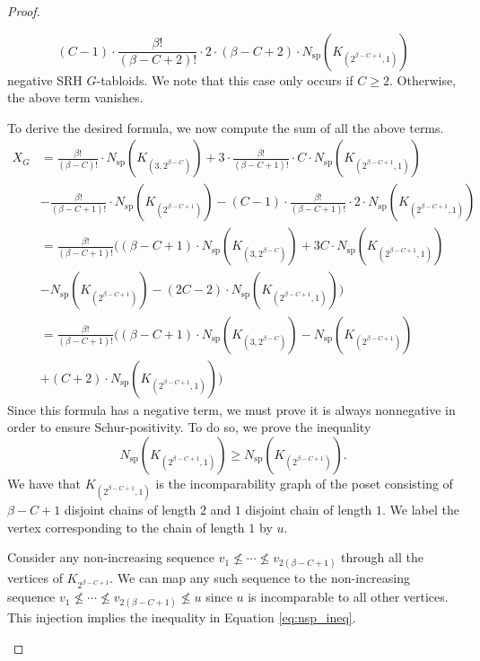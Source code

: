 \documentclass[12pt]{amsart}
\numberwithin{equation}{section}
\theoremstyle{plain}
\theoremstyle{definition}
\theoremstyle{remark}
\begin{document}
\begin{proof}
\begin{enumerate}
\begin{enumerate}[(a)]
        \[
        (C-1)\cdot \frac{\beta !}{(\beta-C+2)!}\cdot 2\cdot (\beta-C+2)\cdot N_{\mathrm{sp}}(K_{(2^{\beta-C+1},1)})
        \]
        negative SRH $G$-tabloids. We note that this case only occurs if $C\ge 2$. Otherwise, the above term vanishes.
    \end{enumerate}
    To derive the desired formula, we now compute the sum of all the above terms.
    \begin{align*}
        [s_{\lambda}]X_{G}&=\frac{\beta !}{(\beta-C)!}\cdot N_{\mathrm{sp}}(K_{(3,2^{\beta-C})})+3\cdot \frac{\beta!}{(\beta-C+1)!}\cdot C \cdot N_{\mathrm{sp}}(K_{(2^{\beta-C+1},1)})\\
        &-\frac{\beta !}{(\beta-C+1)!}\cdot N_{\mathrm{sp}}(K_{(2^{\beta-C+1})})-(C-1)\cdot \frac{\beta !}{(\beta-C+1)!}\cdot 2\cdot N_{\mathrm{sp}}(K_{(2^{\beta-C+1},1)})\\
        &=\frac{\beta!}{(\beta-C+1)!}\Big((\beta-C+1)\cdot N_{\mathrm{sp}}(K_{(3,2^{\beta-C})})+3C\cdot N_{\mathrm{sp}}(K_{(2^{\beta-C+1},1)})\\
        &-N_{\mathrm{sp}}(K_{(2^{\beta-C+1})})-(2C-2)\cdot N_{\mathrm{sp}}(K_{(2^{\beta-C+1},1)})\Big)\\
        &=\frac{\beta !}{(\beta - C+1)!} \Big((\beta-C+1)\cdot N_{\mathrm{sp}}(K_{(3,2^{\beta-C})})-N_{\mathrm{sp}}(K_{(2^{\beta-C+1})})\\
        &+(C+2)\cdot N_{\mathrm{sp}}(K_{(2^{\beta-C+1},1)})\Big)
    \end{align*}
    Since this formula has a negative term, we must prove it is always nonnegative in order to ensure Schur-positivity. To do so, we prove the inequality
    \begin{equation}
    \label{eq:nsp_ineq}
    N_{\mathrm{sp}}(K_{(2^{\beta-C+1},1)})\ge N_{\mathrm{sp}}(K_{(2^{\beta-C+1})}).
    \end{equation}
    We have that $K_{(2^{\beta-C+1},1)}$ is the incomparability graph of the poset consisting of $\beta-C+1$ disjoint chains of length $2$ and $1$ disjoint chain of length $1$. We label the vertex corresponding to the chain of length $1$ by $u$.
    
    Consider any non-increasing sequence $v_1\nleq\cdots\nleq v_{2(\beta-C+1)}$ through all the vertices of $K_{2^{\beta-C+1}}$. We can map any such sequence to the non-increasing sequence $v_1\nleq\cdots\nleq v_{2(\beta-C+1)}\nleq u$ since $u$ is incomparable to all other vertices. This injection implies the inequality in Equation \ref{eq:nsp_ineq}.
    

\end{enumerate}
\end{proof}
\end{document}

